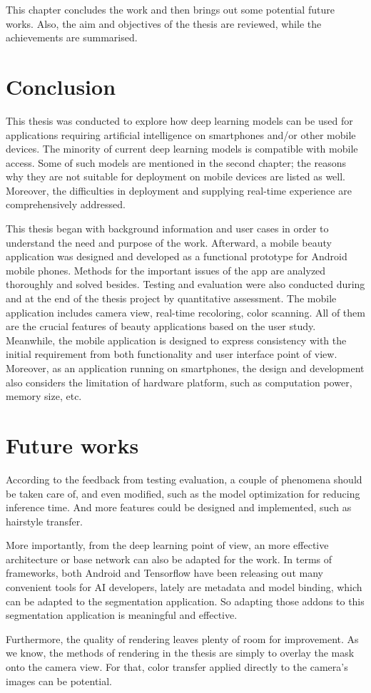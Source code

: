 \label{ch:chap5} 
This chapter concludes the work and then brings out some potential future works. Also, the aim and objectives of the thesis are reviewed, while the achievements are summarised. \par 

\section{Conclusion}

This thesis was conducted to explore how deep learning models can be used for applications requiring artificial intelligence on smartphones and/or other mobile devices. The minority of current deep learning models is compatible with mobile access. Some of such models are mentioned in the second chapter; the reasons why they are not suitable for deployment on mobile devices are listed as well. Moreover, the difficulties in deployment and supplying real-time experience are comprehensively addressed.
 \par
This thesis began with background information and user cases in order to understand the need and purpose of the work. Afterward, a mobile beauty application was designed and developed as a functional prototype for Android mobile phones. Methods for the important issues of the app are analyzed thoroughly and solved besides. Testing and evaluation were also conducted during and at the end of the thesis project by quantitative assessment.
The mobile application includes camera view, real-time recoloring, color scanning. All of them are the crucial features of beauty applications based on the user study. 
Meanwhile, the mobile application is designed to express consistency with the initial requirement from both functionality and user interface point of view. Moreover, as an application running on smartphones, the design and development also considers the limitation of hardware platform, such as computation power, memory size, etc. \par


\section{Future works}

According to the feedback from testing evaluation, a couple of phenomena should be taken care of, and even modified, such as the model optimization for reducing inference time. And more features could be designed and implemented, such as hairstyle transfer.
\par
More importantly, from the deep learning point of view,  an more effective architecture or base network can also be adapted for the work. In terms of frameworks, both Android and Tensorflow have been releasing out many convenient tools for AI developers, lately are metadata and model binding, which can be adapted to the segmentation application. So adapting those addons to this segmentation application is meaningful and effective. \par

Furthermore, the quality of rendering leaves plenty of room for improvement. As we know, the methods of rendering in the thesis are simply to overlay the mask onto the camera view. For that, color transfer applied directly to the camera's images can be potential. 
\par